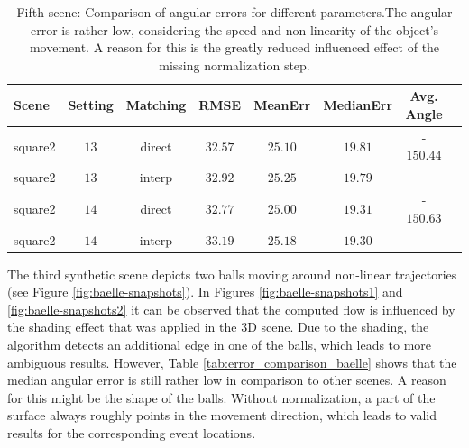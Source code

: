 \begin{table}[tb]
	\centering
		\begin{tabular}{lccccccc}
Scene & Setting & Matching & RMSE & MeanErr & MedianErr & Avg. Angle \\
\hline  \hline
square2 & $13$ & direct & $32.57$ & $25.10$ & $19.81$ & -$150.44$ & \\
square2 & $13$ & interp & $32.92$ & $25.25$ & $19.79$ &  & \\
square2 & $14$ & direct & $32.77$ & $25.00$ & $19.31$ & -$150.63$ & \\
square2 & $14$ & interp & $33.19$ & $25.18$ & $19.30$ &  & \\
		\end{tabular}
	\caption[Fifth scene: Comparison of angular errors for different parameters.]{Fifth scene: Comparison of angular errors for different parameters.The angular error is rather low, considering the speed and non-linearity of the object's movement.
	A reason for this is the greatly reduced influenced effect of the missing normalization step.}
	\label{tab:error_comparison_square2}
\end{table}


The third synthetic scene depicts two balls moving around non-linear trajectories (see Figure \ref{fig:baelle-snapshots}). 
In Figures \ref{fig:baelle-snapshots1} and \ref{fig:baelle-snapshots2} it can be observed that the computed flow is influenced by the shading effect that was applied in the 3D scene. 
Due to the shading, the algorithm detects an additional edge in one of the balls, which leads to more ambiguous results.
However, Table \ref{tab:error_comparison_baelle} shows that the median angular error is still rather low in comparison to other scenes.
A reason for this might be the shape of the balls. 
Without normalization, a part of the surface always roughly points in the movement direction, which leads to valid results for the corresponding event locations.

